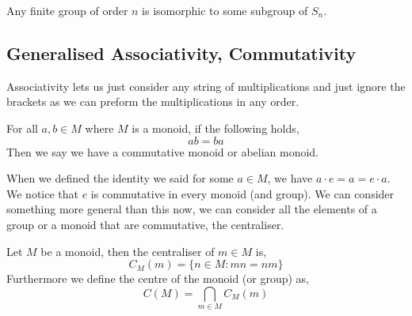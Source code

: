 \begin{ncor}
  Any finite group of order $n$ is isomorphic to some subgroup of $S_n$.
\end{ncor}

\subsection{Generalised Associativity, Commutativity}
Associativity lets us just consider any string of multiplications and just ignore the brackets as we can preform the multiplications in any order.
\begin{ndefi}[Commutativity]
  For all $a, b \in M$ where $M$ is a monoid, if the following holds,
  $$ ab = ba $$
  Then we say we have a commutative monoid or abelian monoid.
\end{ndefi}

\noindent
When we defined the identity we said for some $a \in M$, we have $a \cdot e = a = e \cdot a$. We notice that $e$ is commutative in every monoid (and group). We can consider something more general than this now, we can consider all the elements of a group or a monoid that are commutative, the centraliser.
\begin{ndefi}[Centraliser]
  Let $M$ be a monoid, then the centraliser of $m \in M$ is,
  $$ C_M(m) = \{ n \in M : mn = nm \} $$
  Furthermore we define the centre of the monoid (or group) as,
  $$ C(M) = \bigcap_{m \in M} C_M(m) $$
\end{ndefi}
